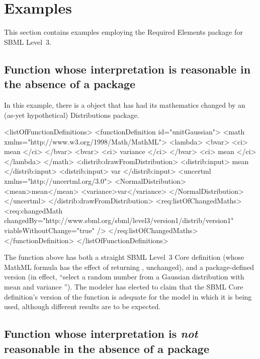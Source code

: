 
\section{Examples}
\label{examples}

This section contains examples employing the Required Elements package for SBML Level~3.

\subsection{Function whose interpretation is reasonable in the absence of a package}

In this example, there is a \FunctionDefinition object that has had its mathematics changed by an (as-yet hypothetical) Distributions package.

\begin{example}
<listOfFunctionDefinitions> 
  <functionDefinition id="unitGaussian"> 
    <math xmlns="http://www.w3.org/1998/Math/MathML"> 
      <lambda>
        <bvar>
          <ci> mean </ci>
        </bvar>
        <bvar>
          <ci> variance </ci>
        </bvar>
        <ci> mean </ci>
      </lambda>
    </math> 
    <distrib:drawFromDistribution>
      <distrib:input> mean </distrib:input>
      <distrib:input> var </distrib:input>
      <uncertml xmlns="http://uncertml.org/3.0">
        <NormalDistribution>
           <mean>mean</mean>
           <variance>var</variance>
         </NormalDistribution>
      </uncertml>
    </distrib:drawFromDistribution>
    <req:listOfChangedMaths>
      <req:changedMath changedBy="http://www.sbml.org/sbml/level3/version1/distrib/version1"
                            viableWithoutChange="true" />
    </req:listOfChangedMaths>
  </functionDefinition> 
</listOfFunctionDefinitions> 
\end{example}

The function  above has both a straight SBML Level~3 Core definition (whose MathML formula has the effect of returning , unchanged), and a package-defined version (in effect, ``select a random number from a Gaussian distribution with mean  and variance ''). The modeler has elected to claim that the SBML Core definition's version of the function is adequate for the model in which it is being used, although different results are to be expected.


\subsection{Function whose interpretation is \emph{not} reasonable in the absence of a package}

